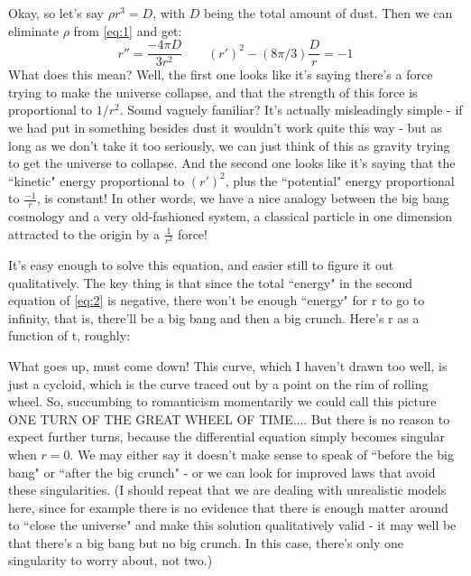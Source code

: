 Okay, so let's say $\rho r^3 = D$, with $D$ being the total amount of dust. Then we can eliminate $\rho$ from \eqref{eq:1} and get:
\begin{equation}\label{eq:2}
    r'' = \frac{-4\pi D}{3r^2} \quad \quad (r')^2 - (8\pi/3) \frac{D}{r} = -1 
\end{equation}
What does this mean? Well, the first one looks like it's saying there's a force trying to make the universe collapse, and that the strength of this force is proportional to $1/r^2$. Sound vaguely familiar? It's actually misleadingly simple - if we had put in something besides dust it wouldn't work quite this way - but as long as we don't take it too seriously, we can just think of this as gravity trying to get the universe to collapse. And the second one looks like it's saying that the ``kinetic" energy proportional to $(r')^2$, plus the ``potential" energy proportional to $\frac{-1}{r}$, is constant! In other words, we have a nice analogy between the big bang cosmology and a very old-fashioned system, a classical particle in one dimension attracted to the origin by a $\frac{1}{r^2}$ force!

It's easy enough to solve this equation, and easier still to figure it out qualitatively. The key thing is that since the total ``energy" in the second equation of \eqref{eq:2} is negative, there won't be enough ``energy" for r to go to infinity, that is, there'll be a big bang and then a big crunch. Here's r as a function of t, roughly:

\begin{center}
\end{center}
  
What goes up, must come down! This curve, which I haven't drawn too well, is just a cycloid, which is the curve traced out by a point on the rim of rolling wheel. So, succumbing to romanticism momentarily we could call this picture ONE TURN OF THE GREAT WHEEL OF TIME.... But there is no reason to expect further turns, because the differential equation simply becomes singular when $r = 0$. We may either say it doesn't make sense to speak of ``before the big bang" or ``after the big crunch" - or we can look for improved laws that avoid these singularities. (I should repeat that we are dealing with unrealistic models here, since for example there is no evidence that there is enough matter around to ``close the universe" and make this solution qualitatively valid - it may well be that there's a big bang but no big crunch. In this case, there's only one singularity to worry about, not two.)

